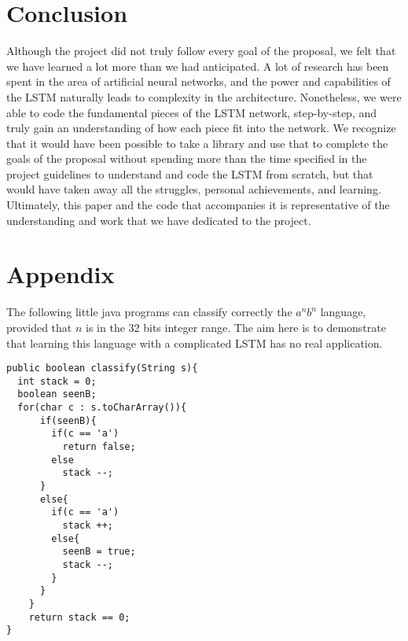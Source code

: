 \documentclass[11pt,letterpaper]{article}
\begin{document}
\section{Conclusion}
Although the project did not truly follow every goal of the proposal, we felt that we have learned a lot more than we had anticipated. A lot of research has been spent in the area of artificial neural networks, and the power and capabilities of the LSTM naturally leads to complexity in the architecture. Nonetheless, we were able to code the fundamental pieces of the LSTM network, step-by-step, and truly gain an understanding of how each piece fit into the network. We recognize that it would have been possible to take a library and use that to complete the goals of the proposal without spending more than the time specified in the project guidelines to understand and code the LSTM from scratch, but that would have taken away all the struggles, personal achievements, and learning. Ultimately, this paper and the code that accompanies it is representative of the understanding and work that we have dedicated to the project.

\section{Appendix}
The following little java programs can classify correctly the $a^nb^n$ language, provided that $n$ is in the 32 bits integer range. The aim here is to demonstrate that learning this language with a complicated LSTM has no real application.

\begin{verbatim}
public boolean classify(String s){
  int stack = 0;
  boolean seenB;
  for(char c : s.toCharArray()){
      if(seenB){
	    if(c == 'a')
          return false;
        else 
          stack --;		
      }
      else{
        if(c == 'a')
          stack ++;
        else{
          seenB = true;
          stack --;
        }
      }
    }
    return stack == 0;
}
\end{verbatim}
\end{document}

